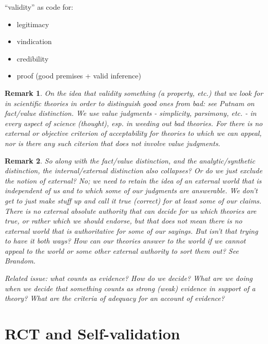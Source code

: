 \documentclass[11pt,twoside]{article}
\newtheorem{remark}{Remark}
\begin{document}
``validity'' as code for:

\begin{itemize}
\item legitimacy
\item vindication
\item credibility
\item proof (good premises + valid inference)
\end{itemize}

\begin{remark}
  On the idea that validity something (a property, etc.) that we look
  for in scientific theories in order to distinguish good ones from
  bad: see Putnam on fact/value distinction.  We use value judgments -
  simplicity, parsimony, etc. - in every aspect of science (thought),
  esp. in weeding out bad theories.  For there is no external or
  objective criterion of acceptability for theories to which we can
  appeal, nor is there any such citerion that does not involve value
  judgments.
\end{remark}

\begin{remark}
  So along with the fact/value distinction, and the analytic/synthetic
  distinction, the internal/external distinction also collapses?  Or
  do we just exclude the notion of external?  No; we need to retain
  the idea of an external world that is independent of us and to which
  some of our judgments are answerable.  We don't get to just make
  stuff up and call it true (correct) for at least some of our claims.
  There is no external absolute authority that can decide for us which
  theories are true, or rather which we should endorse, but that does
  not mean there is no external world that is authoritative for some
  of our sayings.  But isn't that trying to have it both ways?  How
  can our theories answer to the world if we cannot appeal to the
  world or some other external authority to sort them out?  See
  Brandom.

Related issue: what counts as evidence?  How do we decide?  What are
we doing when we decide that something counts as strong (weak)
evidence in support of a theory?  What are the criteria of adequacy
for an account of evidence?
\end{remark}

\section{RCT and Self-validation}
\end{document}
